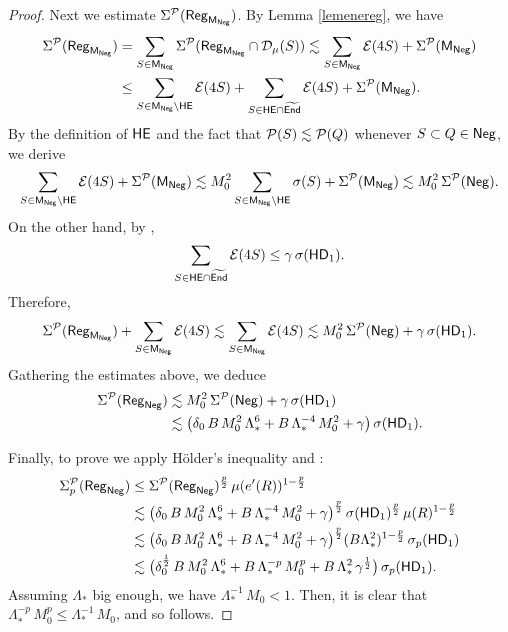 \begin{proof}
Next we estimate $\Sigma^{\mathcal P}({\mathsf{Reg}}_{{\mathsf{M}}_{\mathsf{Neg}}})$. By Lemma \ref{lemenereg}, we have 
\begin{align}\label{eq83e}
\Sigma^{\mathcal P}({\mathsf{Reg}}_{{\mathsf{M}}_{\mathsf{Neg}}})  & =\sum_{S\in{\mathsf{M}}_{\mathsf{Neg}}} \Sigma^{\mathcal P}({\mathsf{Reg}}_{{\mathsf{M}}_{\mathsf{Neg}}}\cap{\mathcal D}_\mu(S))
 \lesssim \sum_{S\in{\mathsf{M}}_{\mathsf{Neg}}} {\mathcal E}(4S) + \Sigma^{\mathcal P}({\mathsf{M}}_{\mathsf{Neg}})\\
 & \leq  \sum_{S\in{\mathsf{M}}_{\mathsf{Neg}}\setminus{\mathsf {HE}}} {\mathcal E}(4S) + \sum_{S\in{\mathsf {HE}}\cap{\widetilde{{\mathsf{End}}}}} {\mathcal E}(4S) + \Sigma^{\mathcal P}({\mathsf{M}}_{\mathsf{Neg}}).\nonumber
\end{align}
By the definition of ${\mathsf {HE}}$ and the fact that ${\mathcal P}(S)\lesssim{\mathcal P}(Q)$ whenever $S\subset Q\in{\mathsf{Neg}}$,
we derive
$$\sum_{S\in{\mathsf{M}}_{\mathsf{Neg}}\setminus{\mathsf {HE}}} {\mathcal E}(4S) + \Sigma^{\mathcal P}({\mathsf{M}}_{\mathsf{Neg}})\lesssim M_0^2\sum_{S\in{\mathsf{M}}_{\mathsf{Neg}}\setminus{\mathsf {HE}}} \sigma(S) + \Sigma^{\mathcal P}({\mathsf{M}}_{\mathsf{Neg}})\lesssim
M_0^2\,\Sigma^{\mathcal P}({\mathsf{Neg}}).$$
On the other hand, by ,
$$\sum_{S\in{\mathsf {HE}}\cap{\widetilde{{\mathsf{End}}}}} {\mathcal E}(4S) \leq\gamma\,\sigma({\mathsf{HD}}_1).
$$
 Therefore,
$$\Sigma^{\mathcal P}({\mathsf{Reg}}_{{\mathsf{M}}_{\mathsf{Neg}}})+ \sum_{S\in{\mathsf{M}}_{\mathsf{Neg}}} {\mathcal E}(4S)\lesssim \sum_{S\in{\mathsf{M}}_{\mathsf{Neg}}} {\mathcal E}(4S) \lesssim M_0^2\,\Sigma^{\mathcal P}({\mathsf{Neg}}) + \gamma\,\sigma({\mathsf{HD}}_1).$$
Gathering the estimates above, we deduce
\begin{align*}
\Sigma^{\mathcal P}({\mathsf{Reg}}_{\mathsf{Neg}})&\lesssim M_0^2\,\Sigma^{\mathcal P}({\mathsf{Neg}}) + \gamma\,\sigma({\mathsf{HD}}_1)\\
& \lesssim
\big(\delta_0\,B\,M_0^2\,\Lambda_*^6 + B\,\Lambda_*^{-4}\,M_0^2+ \gamma\big)\,\sigma({\mathsf{HD}}_1).
\end{align*}

Finally, to prove  we apply H\"older's inequality and :
\begin{align*}
\Sigma_p^{\mathcal P}({\mathsf{Reg}}_{\mathsf{Neg}})& \leq \Sigma^{\mathcal P}({\mathsf{Reg}}_{\mathsf{Neg}})^{\frac p2}\,\mu(e'(R))^{1-\frac p2}\\
& \lesssim \big(\delta_0\,B\,M_0^2\,\Lambda_*^6 + B\,\Lambda_*^{-4}\,M_0^2+ \gamma\big)^{\frac p2}\,\sigma({\mathsf{HD}}_1)^{\frac p2}\,\mu(R)^{1-\frac p2}\\
&\lesssim 
\big(\delta_0\,B\,M_0^2\,\Lambda_*^6 + B\,\Lambda_*^{-4}\,M_0^2+ \gamma\big)^{\frac p2} (B\Lambda_*^2)^{1-\frac p2}
\,\sigma_p({\mathsf{HD}}_1)\\
 & \lesssim
 \big(\delta_0^{\frac12}\,B\,M_0^2\,\Lambda_*^6 + B\,\Lambda_*^{-p}\,M_0^p+ B\,\Lambda_*^2\,\gamma^{\frac12}\big)
\,\sigma_p({\mathsf{HD}}_1).
\end{align*} 
Assuming $\Lambda_*$ big enough, we have $\Lambda_*^{-1}\,M_0<1$. Then, it is clear that $\Lambda_*^{-p}\,M_0^p\leq \Lambda_*^{-1}\,M_0$, and so 
 follows.
\end{proof}
\vv




